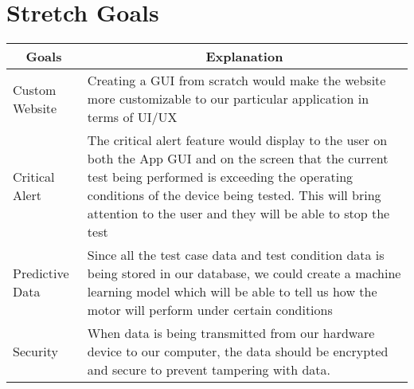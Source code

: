 \documentclass{article}
\begin{document}
\section{Stretch Goals}
    \begin{table}[!hbt]
        \centering
        \begin{tabular}{|p{4cm}|p{8cm}|}
        \hline
        \multicolumn{1}{|c|}{\textbf{Goals}} & \multicolumn{1}{c|}{\textbf{Explanation}} 
        \\ \hline
        Custom Website
        &  Creating a GUI from scratch would make the website more customizable to our particular application in terms of UI/UX   
        \newline                              
        \\ \hline
        Critical Alert                              
        & The critical alert feature would display to the user on both the App GUI and on the screen that the current test being performed is exceeding the operating conditions of the device being tested. This will bring attention to the user and they will be able to stop the test
        \newline
        \\ \hline
        Predictive Data                              
        & Since all the test case data and test condition data is being stored in our database, we could create a machine learning model which will be able to tell us how the motor will perform under certain conditions                         
        \newline       
        \\ \hline
        Security                              
        & When data is being transmitted from our hardware device to our computer, the data should be encrypted and secure to prevent tampering with data.    
        \newline                           
        \\ \hline
        \end{tabular}
    \end{table}
\end{document}
